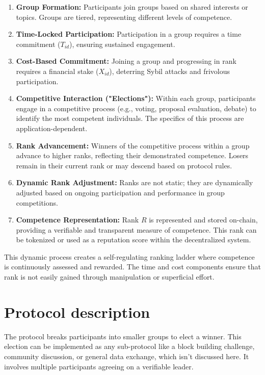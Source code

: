 \documentclass{article}
\begin{document}
\begin{CJK}{UTF8}{gbsn}
    \begin{enumerate}
        \item \textbf{Group Formation:} Participants join groups based on shared interests or topics. Groups are tiered, representing different levels of competence.
        \item \textbf{Time-Locked Participation:}  Participation in a group requires a time commitment ($T_{id}$), ensuring sustained engagement.
        \item \textbf{Cost-Based Commitment:} Joining a group and progressing in rank requires a financial stake ($X_{id}$), deterring Sybil attacks and frivolous participation.
        \item \textbf{Competitive Interaction ("Elections"):} Within each group, participants engage in a competitive process (e.g., voting, proposal evaluation, debate) to identify the most competent individuals. The specifics of this process are application-dependent.
        \item \textbf{Rank Advancement:} Winners of the competitive process within a group advance to higher ranks, reflecting their demonstrated competence. Losers remain in their current rank or may descend based on protocol rules.
        \item \textbf{Dynamic Rank Adjustment:} Ranks are not static; they are dynamically adjusted based on ongoing participation and performance in group competitions.
        \item \textbf{Competence Representation:}  Rank $R$ is represented and stored on-chain, providing a verifiable and transparent measure of competence. This rank can be tokenized or used as a reputation score within the decentralized system.
    \end{enumerate}

    This dynamic process creates a self-regulating ranking ladder where competence is continuously assessed and rewarded. The time and cost components ensure that rank is not easily gained through manipulation or superficial effort.

    \section{Protocol description}

    The protocol breaks participants into smaller groups to elect a winner. This election can be implemented as any sub-protocol like a block building challenge, community discussion, or general data exchange, which isn't discussed here. It involves multiple participants agreeing on a verifiable leader.


\end{CJK}
\end{document}
